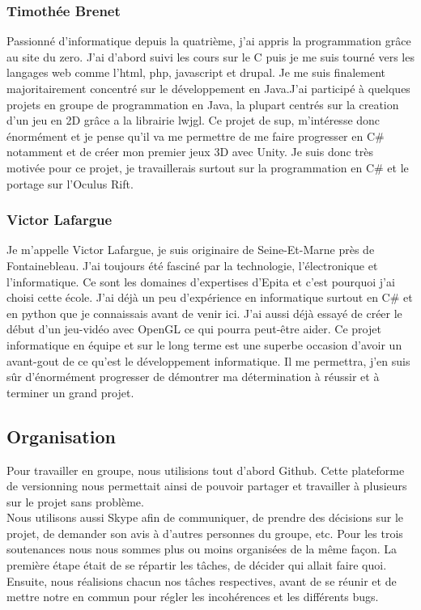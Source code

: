 \documentclass[12pt]{article}
\begin{document}
\subsubsection{Timothée Brenet}

Passionné d'informatique depuis la quatrième, j'ai appris la programmation grâce au site du zero. J'ai d'abord suivi les cours sur le C puis je me suis tourné vers les langages web comme l'html, php, javascript et drupal. Je me suis finalement majoritairement concentré sur le développement en Java.J'ai participé à quelques projets en groupe de programmation en Java, la plupart centrés sur la creation d'un jeu en 2D grâce a la librairie lwjgl. Ce projet de sup, m'intéresse donc énormément et je pense qu'il va me permettre de me faire progresser en C\# notamment et de créer mon premier jeux 3D avec Unity. Je suis donc très motivée pour ce projet, je travaillerais surtout sur la programmation en C\# et le portage sur l'Oculus Rift.

\subsubsection{Victor Lafargue}

Je m'appelle Victor Lafargue, je suis originaire de Seine-Et-Marne près de Fontainebleau. J'ai toujours été fasciné par la technologie, l'électronique et l'informatique. Ce sont les domaines d'expertises d'Epita et c'est pourquoi j'ai choisi cette école. J'ai déjà un peu d'expérience en informatique surtout en C\# et en python que je connaissais avant de venir ici. J'ai aussi déjà essayé de créer le début d'un jeu-vidéo avec OpenGL ce qui pourra peut-être aider. Ce projet informatique en équipe et sur le long terme est une superbe occasion d'avoir un  avant-gout de ce qu'est le développement informatique. Il me permettra, j'en suis sûr d'énormément progresser de démontrer ma détermination à réussir et à terminer un grand projet.

\subsection{Organisation}

Pour travailler en groupe, nous utilisions tout d'abord Github. Cette plateforme de versionning nous permettait ainsi de pouvoir partager et travailler à plusieurs sur le projet sans problème.\\
Nous utilisons aussi Skype afin de communiquer, de prendre des décisions sur le projet, de demander son avis à d'autres personnes du groupe, etc.
Pour les trois soutenances nous nous sommes plus ou moins organisées de la même façon. La première étape était de se répartir les tâches, de décider qui allait faire quoi. Ensuite, nous réalisions chacun nos tâches respectives, avant de se réunir et de mettre notre en commun pour régler les incohérences et les différents bugs.
\end{document}
